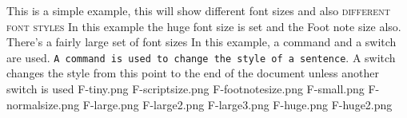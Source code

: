This is a simple example, {\tiny this will show different font sizes} and also \textsc{different font styles}
In this example the {\huge huge font size} is set and 
the {\footnotesize Foot note size also}. There's a fairly 
large set of font sizes
In this example, a command and a switch are used. 
\texttt{A command is used to change the style 
of a sentence}.
\sffamily
A switch changes the style from this point to 
the end of the document unless another switch is used
\renewcommand{\familydefault}{\sfdefault}
\renewcommand{\familydefault}{\rmdefault}
\tiny	F-tiny.png
\scriptsize	F-scriptsize.png
\footnotesize	F-footnotesize.png
\small	F-small.png
\normalsize	F-normalsize.png
\large	F-large.png
\Large	F-large2.png
\LARGE	F-large3.png
\huge	F-huge.png
\Huge	F-huge2.png
